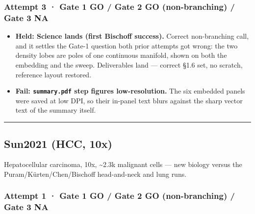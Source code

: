 \documentclass[11pt,a4paper]{article}
\providecommand{\tightlist}{\setlength{\itemsep}{0pt}\setlength{\parskip}{0pt}}
\begin{document}
\hypertarget{attempt-3-gate-1-go-gate-2-go-non-branching-gate-3-na}{%
\subsubsection{Attempt 3 · Gate 1 GO / Gate 2 GO (non-branching) / Gate
3 NA}\label{attempt-3-gate-1-go-gate-2-go-non-branching-gate-3-na}}

\begin{itemize}
\tightlist
\item
  \textbf{Held: Science lands (first Bischoff success).} Correct
  non-branching call, and it settles the Gate-1 question both prior
  attempts got wrong: the two density lobes are poles of one continuous
  manifold, shown on both the embedding and the sweep. Deliverables land
  --- correct §1.6 set, no scratch, reference layout restored.
\item
  \textbf{Fail: \texttt{summary.pdf} step figures low-resolution.}
  The six embedded panels were saved at low DPI, so their in-panel text
  blurs against the sharp vector text of the summary itself.
\end{itemize}

\begin{center}\rule{0.5\linewidth}{0.5pt}\end{center}

\hypertarget{sun-2021-hcc-10x}{%
\subsection{Sun2021 (HCC, 10x)}\label{sun-2021-hcc-10x}}

Hepatocellular carcinoma, 10x, \textasciitilde2.3k malignant cells ---
new biology versus the Puram/Kürten/Chen/Bischoff head-and-neck and lung
runs.

\hypertarget{attempt-1-gate-1-go-gate-2-go-non-branching-gate-3-na}{%
\subsubsection{Attempt 1 · Gate 1 GO / Gate 2 GO (non-branching) / Gate
3 NA}\label{attempt-1-gate-1-go-gate-2-go-non-branching-gate-3-na}}
\end{document}

